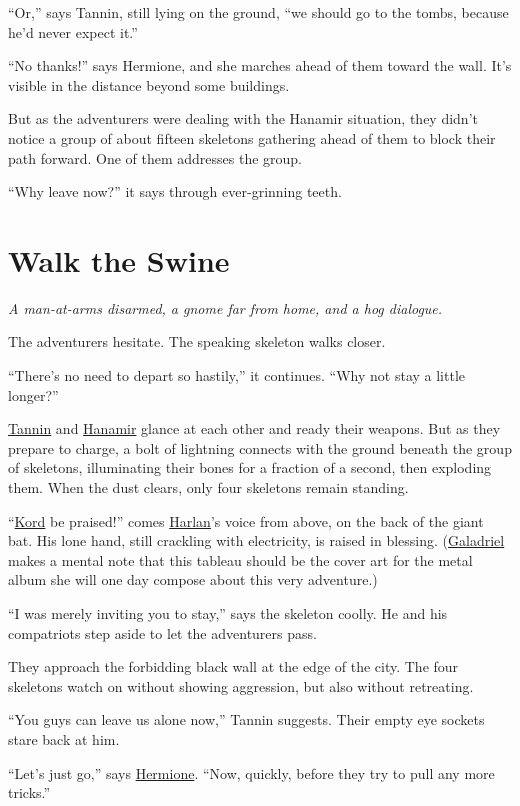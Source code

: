 \documentclass[smalldemyvopaper,11pt,twoside,onecolumn,openright,extrafontsizes]{memoir}
\newcommand{\chapdesc}[1]{
    \begin{flushright}
    \emph{{#1}}
    \end{flushright}
    \vspace{26pt}
}
\begin{document}
``Or,'' says Tannin, still lying on the ground, ``we should go to the
tombs, because he'd never expect it.''

``No thanks!'' says Hermione, and she marches ahead of them toward the
wall. It's visible in the distance beyond some buildings.

But as the adventurers were dealing with the Hanamir situation, they
didn't notice a group of about fifteen skeletons gathering ahead of them
to block their path forward. One of them addresses the group.

``Why leave now?'' it says through ever-grinning teeth.


\chapter{Walk the Swine}
\chapdesc{A man-at-arms disarmed, a gnome far from home, and a hog dialogue.}

The adventurers hesitate. The speaking skeleton walks closer.

``There's no need to depart so hastily,'' it continues. ``Why not stay a
little longer?''

\href{/characters/tannin/}{Tannin} and
\href{/characters/hanamir/}{Hanamir} glance at each other and ready
their weapons. But as they prepare to charge, a bolt of lightning
connects with the ground beneath the group of skeletons, illuminating
their bones for a fraction of a second, then exploding them. When the
dust clears, only four skeletons remain standing.

``\href{/characters/kord/}{Kord} be praised!'' comes
\href{/characters/harlan/}{Harlan}'s voice from above, on the back of
the giant bat. His lone hand, still crackling with electricity, is
raised in blessing. (\href{/characters/galadriel/}{Galadriel} makes a
mental note that this tableau should be the cover art for the metal
album she will one day compose about this very adventure.)

``I was merely inviting you to stay,'' says the skeleton coolly. He and
his compatriots step aside to let the adventurers pass.

They approach the forbidding black wall at the edge of the city. The
four skeletons watch on without showing aggression, but also without
retreating.

``You guys can leave us alone now,'' Tannin suggests. Their empty eye
sockets stare back at him.

``Let's just go,'' says \href{/characters/hermione/}{Hermione}. ``Now,
quickly, before they try to pull any more tricks.''
\end{document}
